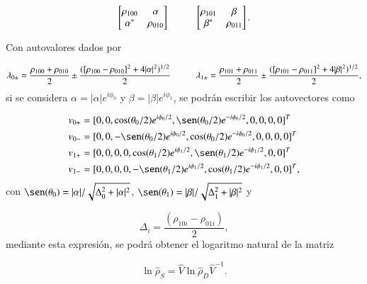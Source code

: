 \begin{appendixs}
\begin{equation*}
    \begin{bmatrix}
        \rho_{100} & \alpha \\
        \alpha^{*} & \rho_{010}
    \end{bmatrix}
    \hspace{10mm}
    \begin{bmatrix}
        \rho_{101} & \beta \\
        \beta^{*} & \rho_{011}
    \end{bmatrix}.
\end{equation*}

Con autovalores dados por

\begin{equation*}
    \lambda_{0\pm} = \frac{ \rho_{100} +\rho_{010} }{2} \pm \frac{( [\rho_{100} - \rho_{010}]^{2} + 4|\alpha|^{2} )^{1/2} }{ 2 }  \hspace{10mm}      \lambda_{1\pm} = \frac{ \rho_{101} +\rho_{011} }{2} \pm \frac{( [\rho_{101} - \rho_{011}]^{2} + 4|\beta|^{2} )^{1/2} }{ 2 }, 
\end{equation*}
si se considera $\alpha = |\alpha|e^{i\phi_{0}}$ y $\beta = |\beta|e^{i\phi_{1}}$, se podrán escribir los autovectores como

\begin{align*}
    v_{0+} &  = [0,0,\cos(\theta_{0}/2)e^{i\phi_{0}/2},\sen(\theta_{0}/2)e^{-i\phi_{0}/2},0,0,0,0]^{T} \\
    v_{0-} &  = [0,0,-\sen(\theta_{0}/2)e^{i\phi_{0}/2},\cos(\theta_{0}/2)e^{-i\phi_{0}/2},0,0,0,0]^{T} \\
    v_{1+} &  = [0,0,0,0,\cos(\theta_{1}/2)e^{i\phi_{1}/2},\sen(\theta_{1}/2)e^{-i\phi_{1}/2},0,0]^{T} \\
    v_{1-} &  = [0,0,0,0,-\sen(\theta_{1}/2)e^{i\phi_{1}/2},\cos(\theta_{1}/2)e^{-i\phi_{1}/2},0,0]^{T},                   
\end{align*}
con $\sen(\theta_{0}) = |\alpha|/\sqrt{\Delta^{2}_{0} + |\alpha|^{2}}$, $\sen(\theta_{1}) = |\beta|/\sqrt{\Delta^{2}_{1} + |\beta|^{2}}$ y

\begin{equation*}
    \Delta_{i} = \frac{(\rho_{10i} - \rho_{01i})}{2},
\end{equation*}
mediante esta expresión, se podrá obtener el logaritmo natural de la matriz 

\begin{equation*}
    \ln \hat{\rho}_{S} = \hat{V}\ln \hat{\rho}_{D} \hat{V}^{-1}.
\end{equation*}
    

\end{appendixs}
